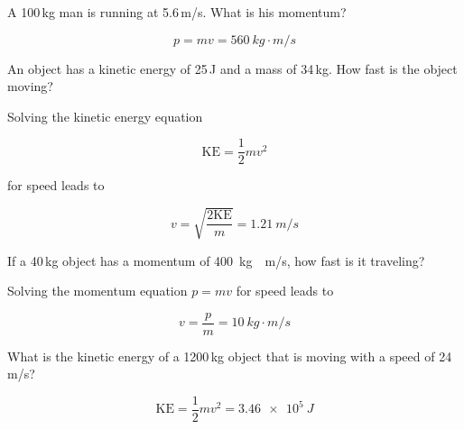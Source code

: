 \documentclass[answers]{exam}
\begin{document}
\begin{questions}
\question %
A 100\,kg man is running at 5.6\,m/s. What is his momentum? 

\begin{solution}
\phantom{.}

\begin{equation*}
    p = mv = \boxed{\SI{560}{kg\cdot m/s}}
\end{equation*}
\end{solution}



\question %
An object has a kinetic energy of 25\,J and a mass of 34\,kg. How fast is the object moving? 

\begin{solution}
Solving the kinetic energy equation

\begin{equation*}
    \mathrm{KE} = \frac{1}{2} mv^2
\end{equation*}

for speed leads to

\begin{equation*}
    v = \sqrt{\frac{2\mathrm{KE}}{m}} = \boxed{\SI{1.21}{m/s}}
\end{equation*}
\end{solution}

\question %
If a 40\,kg object has a momentum of \SI{400}{kg\cdot m/s}, how fast is it traveling?

\begin{solution}
Solving the momentum equation $p = mv$ for speed leads to

\begin{equation*}
    v = \frac{p}{m} = \boxed{\SI{10}{kg\cdot m/s}}
\end{equation*}
\end{solution}


     
\question %
What is the kinetic energy of a 1200\,kg object that is moving with a speed of 24\,m/s? 

\begin{solution}
\begin{equation*}
    \mathrm{KE} = \frac{1}{2} mv^2 = \boxed{\SI{3.46e5}{J}}
\end{equation*}
\end{solution}


\end{questions}
\end{document}
